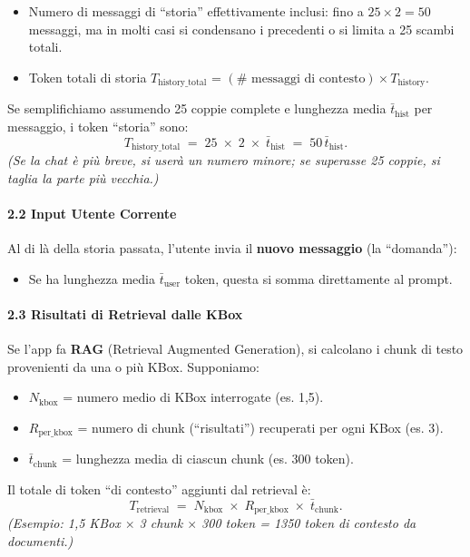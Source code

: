 \documentclass{article}
\begin{document}
\begin{itemize}
    \item Numero di messaggi di ``storia'' effettivamente inclusi: fino a \(25 \times 2 = 50\) messaggi, ma in molti casi si condensano i precedenti o si limita a 25 scambi totali.
    \item Token totali di storia \(\displaystyle T_{\text{history\_total}}\) = \(\displaystyle (\#\text{ messaggi di contesto}) \times T_{\text{history}}\).
\end{itemize}

Se semplifichiamo assumendo 25 coppie complete e lunghezza media \(\bar{t}_{\text{hist}}\) per messaggio, i token ``storia'' sono:
\[
T_{\text{history\_total}} \;=\; 25 \;\times\; 2 \;\times\; \bar{t}_{\text{hist}}
\;=\;
50 \,\bar{t}_{\text{hist}}.
\]
\emph{(Se la chat è più breve, si userà un numero minore; se superasse 25 coppie, si taglia la parte più vecchia.)}

\paragraph{2.2 Input Utente Corrente}
Al di là della storia passata, l'utente invia il \textbf{nuovo messaggio} (la ``domanda''):
\begin{itemize}
    \item Se ha lunghezza media \(\bar{t}_{\text{user}}\) token, questa si somma direttamente al prompt.
\end{itemize}

\paragraph{2.3 Risultati di Retrieval dalle KBox}
Se l'app fa \textbf{RAG} (Retrieval Augmented Generation), si calcolano i chunk di testo provenienti da una o più KBox. Supponiamo:
\begin{itemize}
    \item \(\displaystyle N_{\text{kbox}}\) = numero medio di KBox interrogate (es. 1,5).
    \item \(\displaystyle R_{\text{per\_kbox}}\) = numero di chunk (``risultati'') recuperati per ogni KBox (es. 3).
    \item \(\displaystyle \bar{t}_{\text{chunk}}\) = lunghezza media di ciascun chunk (es. 300 token).
\end{itemize}

Il totale di token ``di contesto'' aggiunti dal retrieval è:
\[
T_{\text{retrieval}}
\;=\;
N_{\text{kbox}}
\;\times\;
R_{\text{per\_kbox}}
\;\times\;
\bar{t}_{\text{chunk}}.
\]
\emph{(Esempio: 1,5 KBox $\times$ 3 chunk $\times$ 300 token = 1350 token di contesto da documenti.)}
\end{document}
